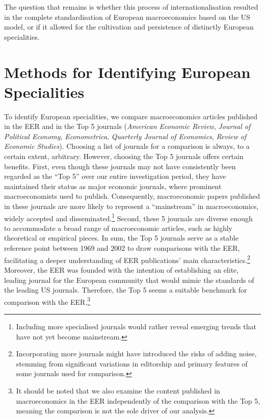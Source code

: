 \documentclass[
  12pt,
  onecolumn]{article}
\begin{document}
The question that remains is whether this process of internationalisation resulted in the complete standardisation of European macroeconomics based on the US model, or if it allowed for the cultivation and persistence of distinctly European specialities.

\hypertarget{methods}{%
\section{Methods for Identifying European Specialities}\label{methods}}

To identify European specialities, we compare macroeconomics articles published in the EER and in the Top 5 journals (\emph{American Economic Review}, \emph{Journal of Political Economy}, \emph{Econometrica}, \emph{Quarterly Journal of Economics}, \emph{Review of Economic Studies}). Choosing a list of journals for a comparison is always, to a certain extent, arbitrary. However, choosing the Top 5 journals offers certain benefits. First, even though these journals may not have consistently been regarded as the ``Top 5'' over our entire investigation period, they have maintained their status as major economic journals, where prominent macroeconomists used to publish. Consequently, macroeconomic papers published in these journals are more likely to represent a ``mainstream'' in macroeconomics, widely accepted and disseminated.\footnote{Including more specialised journals would rather reveal emerging trends that have not yet become mainstream.} Second, these 5 journals are diverse enough to accommodate a broad range of macroeconomic articles, such as highly theoretical or empirical pieces. In sum, the Top 5 journals serve as a stable reference point between 1969 and 2002 to draw comparisons with the EER, facilitating a deeper understanding of EER publications' main characteristics.\footnote{Incorporating more journals might have introduced the risks of adding noise, stemming from significant variations in editorship and primary features of some journals used for comparison.} Moreover, the EER was founded with the intention of establishing an elite, leading journal for the European community that would mimic the standards of the leading US journals. Therefore, the Top 5 seems a suitable benchmark for comparison with the EER.\footnote{It should be noted that we also examine the content published in macroeconomics in the EER independently of the comparison with the Top 5, meaning the comparison is not the sole driver of our analysis.}
\end{document}
